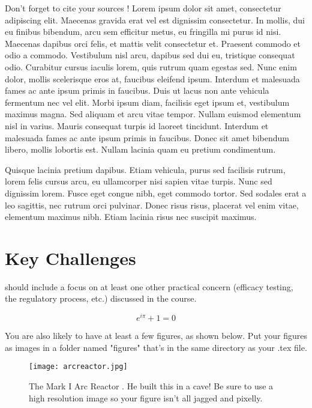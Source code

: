 \documentclass[twocolumn]{IEEEtran}
\begin{document}
Don't forget to cite your sources \cite{Truskey}! Lorem ipsum dolor sit amet, consectetur adipiscing elit. Maecenas gravida erat vel est dignissim consectetur. In mollis, dui eu finibus bibendum, arcu sem efficitur metus, eu fringilla mi purus id nisi. Maecenas dapibus orci felis, et mattis velit consectetur et. Praesent commodo et odio a commodo. Vestibulum nisl arcu, dapibus sed dui eu, tristique consequat odio. Curabitur cursus iaculis lorem, quis rutrum quam egestas sed. Nunc enim dolor, mollis scelerisque eros at, faucibus eleifend ipsum. Interdum et malesuada fames ac ante ipsum primis in faucibus. Duis ut lacus non ante vehicula fermentum nec vel elit. Morbi ipsum diam, facilisis eget ipsum et, vestibulum maximus magna. Sed aliquam et arcu vitae tempor. Nullam euismod elementum nisl in varius. Mauris consequat turpis id laoreet tincidunt. Interdum et malesuada fames ac ante ipsum primis in faucibus. Donec sit amet bibendum libero, mollis lobortis est. Nullam lacinia quam eu pretium condimentum.

Quisque lacinia pretium dapibus. Etiam vehicula, purus sed facilisis rutrum, lorem felis cursus arcu, eu ullamcorper nisi sapien vitae turpis. Nunc sed dignissim lorem. Fusce eget congue nibh, eget commodo tortor. Sed sodales erat a leo sagittis, nec rutrum orci pulvinar. Donec risus risus, placerat vel enim vitae, elementum maximus nibh. Etiam lacinia risus nec suscipit maximus.


\section{Key Challenges}
 should include a focus on at least one other practical concern (efficacy testing, the regulatory process, etc.) discussed in the course.

\begin{equation}
e^{i \pi} + 1 = 0
\end{equation}

You are also likely to have at least a few figures, as shown below. Put your figures as images in a folder named "figures" that's in the same directory as your .tex file.

\begin{figure}[h]
\begin{center}
\texttt{[image: arcreactor.jpg]}
\end{center}
\caption{The Mark I Arc Reactor \cite{ironman}. He built this in a cave! Be sure to use a high resolution image so your figure isn't all jagged and pixelly.}
\end{figure}
\end{document}
